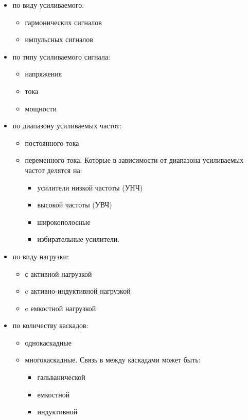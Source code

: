 \begin{itemize}
\item по виду усиливаемого:
	\begin{itemize}
	\item гармонических сигналов
	\item импульсных сигналов
	\end{itemize}
\item по типу усиливаемого сигнала:
	\begin{itemize}
	\item напряжения
	\item тока 
	\item мощности
	\end{itemize}
\item по диапазону усиливаемых частот:
	\begin{itemize}
	\item постоянного тока 
	\item переменного тока. Которые в зависимости от диапазона усиливаемых частот делятся на:
		\begin{itemize}
		\item усилители низкой частоты (УНЧ)
		\item высокой частоты (УВЧ)
		\item широкополосные
		\item избирательные усилители.
		\end{itemize}
	\end{itemize}
\item по виду нагрузки:
	\begin{itemize}
	\item с активной нагрузкой
	\item c активно-индуктивной нагрузкой
	\item c емкостной нагрузкой
	\end{itemize}
\item по количеству каскадов:
	\begin{itemize}
	\item однокаскадные 
	\item многокаскадные. Связь в между каскадами может быть:
		\begin{itemize}
		\item гальванической
		\item емкостной
		\item индуктивной
		\end{itemize}
	\end{itemize}
\end{itemize}

